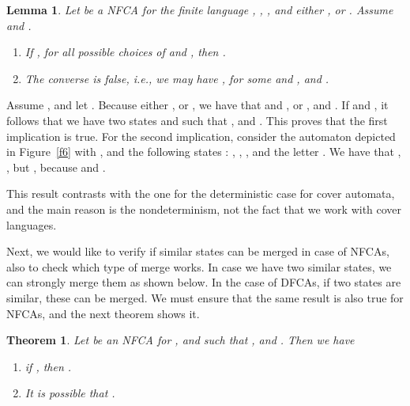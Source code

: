 \documentclass[submission,copyright,creativecommons]{eptcs}
\newtheorem{lemma}{Lemma}
\newtheorem{theorem}{Theorem}
\newenvironment{proof}[1][Proof]{\begin{trivlist}
\item[\hskip \labelsep {\bfseries #1}]}{\end{trivlist}}
\begin{document}
\begin{lemma}
  Let  be  a NFCA for the finite language , , ,
and either , or .
Assume  and .
\begin{enumerate}
 \item  If , for all possible choices of  and , then .
 \item  The converse is false, i.e., we may have  , for some  and , and .
\end{enumerate}
\end{lemma}
\begin{proof}
Assume  , and let . 
Because either , or , 
we have that  and , 
or   , and .
If  and , 
it follows that we have two states  and 
such that  , and .
This proves that the first implication is true. For the second implication, 
consider the automaton depicted in Figure~\ref{f6} with , and the following states :
 , , , and the letter . We have that 
, , 
but , because  
and .
\end{proof}

This result contrasts with the one for the deterministic case for cover automata, 
and the main reason is the nondeterminism, not the fact that we work with  cover languages.


Next, we would like to verify if similar states can be merged in case of NFCAs, also to check
 which type of merge works.
In case we have two similar states, we can strongly merge them as shown below.
In the case of DFCAs, if two states are similar, these can be merged. We must ensure that 
the same result is also true for  NFCAs, and the next theorem 
shows it. 


\begin{theorem}
\label{ltech1}
 Let  be an NFCA for ,
and  such that ,  and .
Then we have
\begin{enumerate}
 \item if , then .
 \item It is possible that .
\end{enumerate}
\end{theorem}
\end{document}
